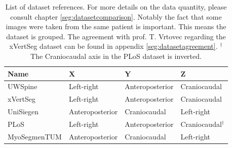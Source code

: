 \begin{table}
 
    \begin{tabular}{ l l l l} 
     \hline
     \hline
     Name & X & Y & Z \\
     \hline 
    UWSpine & Left-right & Anteroposterior & Craniocaudal \\
    xVertSeg & Left-right & Anteroposterior & Craniocaudal \\
    UniSiegen  &  Anteroposterior & Craniocaudal & Left-right \\
    PLoS & Left-right & Anteroposterior & Craniocaudal$^\dagger$ \\
    MyoSegmenTUM &  Anteroposterior & Craniocaudal & Left-right \\
     \hline
     \hline
    \end{tabular}
    \caption{List of dataset references. For more details on the data quantity, please consult chapter \ref{seg:datasetcomparison}. 
    Notably the fact that some images were taken from the same patient is important. This means the dataset is grouped. 
    The agreement with prof. T. Vrtovec regarding the xVertSeg dataset can be found in appendix \ref{seg:datasetagreement}.
    $^\dagger$ The Craniocaudal axis in the PLoS dataset is inverted.}

\end{table}

